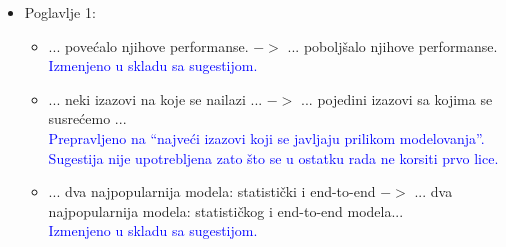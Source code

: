 \documentclass[a4paper]{report}
\newcommand{\odgovor}[1]{\textcolor{blue}{#1}}
\begin{document}
\begin{itemize}
  \item Poglavlje 1:
  \begin{itemize}
  \item ... povećalo njihove performanse. $->$ ... poboljšalo njihove performanse.\\ \odgovor{Izmenjeno u skladu sa sugestijom.}
  \item ... neki izazovi na koje se nailazi ... $->$ ... pojedini izazovi sa kojima se susrećemo ... \\ \odgovor{Prepravljeno na ``najveći izazovi koji se javljaju prilikom modelovanja''. Sugestija nije upotrebljena zato što se u ostatku rada ne korsiti prvo lice.}
  \item ... dva najpopularnija modela: statistički i end-to-end $->$ ... dva najpopularnija modela: statističkog i end-to-end modela...\\ \odgovor{Izmenjeno u skladu sa sugestijom.}
 \end{itemize}
\end{itemize}
\end{document}
